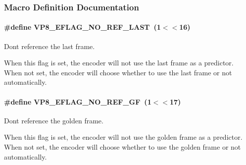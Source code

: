 \subsubsection{Macro Definition Documentation}
\paragraph[{\texorpdfstring{V\+P8\+\_\+\+E\+F\+L\+A\+G\+\_\+\+N\+O\+\_\+\+R\+E\+F\+\_\+\+L\+A\+ST}{VP8_EFLAG_NO_REF_LAST}}]{\setlength{\rightskip}{0pt plus 5cm}\#define V\+P8\+\_\+\+E\+F\+L\+A\+G\+\_\+\+N\+O\+\_\+\+R\+E\+F\+\_\+\+L\+A\+ST~(1$<$$<$16)}\hypertarget{group__vp8__encoder_gafb51c67e5743275146bc1fc425727da3}{}\label{group__vp8__encoder_gafb51c67e5743275146bc1fc425727da3}


Don\textquotesingle{}t reference the last frame. 

When this flag is set, the encoder will not use the last frame as a predictor. When not set, the encoder will choose whether to use the last frame or not automatically. 
\paragraph[{\texorpdfstring{V\+P8\+\_\+\+E\+F\+L\+A\+G\+\_\+\+N\+O\+\_\+\+R\+E\+F\+\_\+\+GF}{VP8_EFLAG_NO_REF_GF}}]{\setlength{\rightskip}{0pt plus 5cm}\#define V\+P8\+\_\+\+E\+F\+L\+A\+G\+\_\+\+N\+O\+\_\+\+R\+E\+F\+\_\+\+GF~(1$<$$<$17)}\hypertarget{group__vp8__encoder_gabb5e95343a2738abef44eca13059da33}{}\label{group__vp8__encoder_gabb5e95343a2738abef44eca13059da33}


Don\textquotesingle{}t reference the golden frame. 

When this flag is set, the encoder will not use the golden frame as a predictor. When not set, the encoder will choose whether to use the golden frame or not automatically. 
